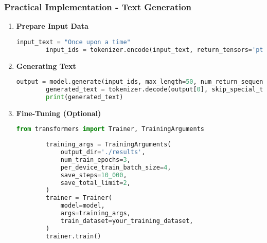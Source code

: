 \documentclass[aspectratio=169]{beamer}
\begin{document}
\begin{frame}[fragile]
    \frametitle{Practical Implementation - Text Generation}
    \begin{enumerate}[resume]
        \item \textbf{Prepare Input Data}
        \begin{lstlisting}[language=Python]
        input_text = "Once upon a time"
        input_ids = tokenizer.encode(input_text, return_tensors='pt')
        \end{lstlisting}

        \item \textbf{Generating Text}
        \begin{lstlisting}[language=Python]
        output = model.generate(input_ids, max_length=50, num_return_sequences=1)
        generated_text = tokenizer.decode(output[0], skip_special_tokens=True)
        print(generated_text)
        \end{lstlisting}

        \item \textbf{Fine-Tuning (Optional)}
        \begin{lstlisting}[language=Python]
        from transformers import Trainer, TrainingArguments
        
        training_args = TrainingArguments(
            output_dir='./results',
            num_train_epochs=3,
            per_device_train_batch_size=4,
            save_steps=10_000,
            save_total_limit=2,
        )
        trainer = Trainer(
            model=model,
            args=training_args,
            train_dataset=your_training_dataset,
        )
        trainer.train()
        \end{lstlisting}
    \end{enumerate}
\end{frame}
\end{document}
